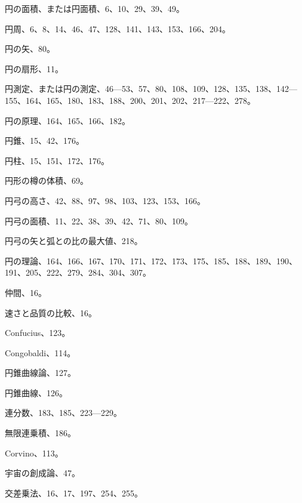 \documentclass[11pt]{article}
\begin{document}
円の面積、または円面積、6、10、29、39、49。\par
円周、6、8、14、46、47、128、141、143、153、166、204。\par
円の矢、80。\par
円の扇形、11。\par
円測定、または円の測定、46---53、57、80、108、109、128、135、138、142---155、164、165、180、183、188、200、201、202、217---222、278。\par
円の原理、164、165、166、182。\par
円錐、15、42、176。\par
円柱、15、151、172、176。\par
円形の樽の体積、69。\par
円弓の高さ、42、88、97、98、103、123、153、166。\par
円弓の面積、11、22、38、39、42、71、80、109。\par
円弓の矢と弧との比の最大値、218。\par
円の理論、164、166、167、170、171、172、173、175、185、188、189、190、191、205、222、279、284、304、307。\par
仲間、16。\par
速さと品質の比較、16。\par
Confucius、123。\par
Congobaldi、114。\par
円錐曲線論、127。\par
円錐曲線、126。\par
連分数、183、185、223---229。\par
無限連乗積、186。\par
Corvino、113。\par
宇宙の創成論、47。\par
交差乗法、16、17、197、254、255。\par
\end{document}

